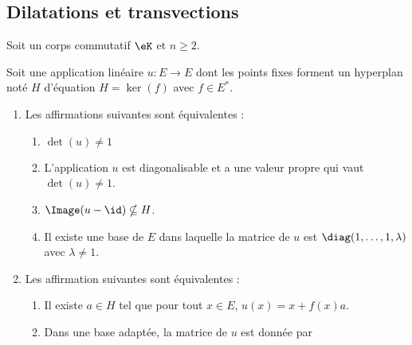 \subsection{Dilatations et transvections}

Soit un corps commutatif \( \eK\) et \( n\geq 2\).

\begin{theoremDef}     \label{ThoooAZKDooNDcznv}
    Soit une application linéaire \( u\colon E\to E\) dont les points fixes forment un hyperplan noté \( H\) d'équation \( H=\ker(f)\) avec \( f\in E^*\).
    \begin{enumerate}
        \item     \label{ITEMooGTKRooQSPNoI}
            Les affirmations suivantes sont équivalentes :
            \begin{enumerate}
                \item  \label{ITEMooZHYRooFGKaifi}
                    \( \det(u)\neq 1\)
                \item       \label{ooXKLWooTfUMzV}
                    L'application \( u\) est diagonalisable et a une valeur propre qui vaut \( \det(u)\neq 1\).
                \item       \label{ooMZPTooCLylbh}  
                    \( \Image(u-\id)\nsubseteq H\).
                \item   \label{ITEMooZHYRooFGKaifiv}
                    Il existe une base de \( E\) dans laquelle la matrice de \( u\) est \( \diag(1,\ldots, 1,\lambda)\) avec \( \lambda\neq 1\).
            \end{enumerate}
        \item       \label{ITEMooMSJXooUsLCHx}
            Les affirmation suivantes sont équivalentes :
            \let\oldthenumii\theenumi
            \renewcommand{\theenumii}{\roman{enumii}}
            \begin{enumerate}
                \item       \label{ITEMooRTIEooOoWCFsa}
                    Il existe \( a\in H\) tel que pour tout \( x\in E\), \( u(x)=x+f(x)a\).
                \item       \label{ITEMooRTIEooOoWCFsb}
                    Dans une base adaptée, la matrice de \( u\) est donnée par
                    \begin{equation}        \label{EQooFXBDooTgZwMv}

\end{equation}
\end{enumerate}
\end{enumerate}
\end{theoremDef}
